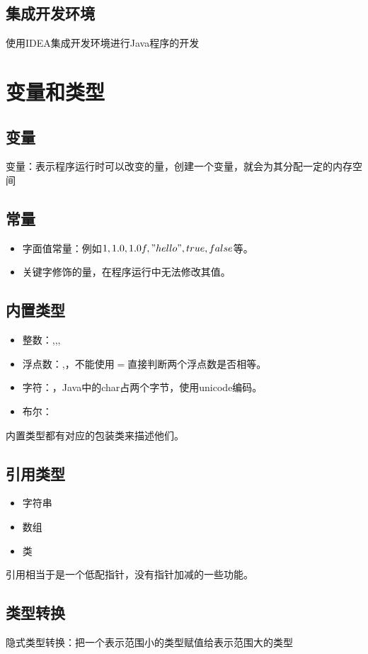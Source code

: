 \documentclass[a4paper]{report}
\begin{document}
\subsection{集成开发环境}
使用IDEA集成开发环境进行Java程序的开发

\section{变量和类型}
\subsection{变量}
变量：表示程序运行时可以改变的量，创建一个变量，就会为其分配一定的内存空间
\subsection{常量}
\begin{itemize}
\itemsep=0pt \parskip =0pt
  \item 字面值常量：例如$1,1.0,1.0f,"hello",true,false$等。
  \item {}关键字修饰的量，在程序运行中无法修改其值。
\end{itemize}
\subsection{内置类型}
\begin{itemize}
\itemsep=0pt \parskip =0pt
  \item 整数：,,,
  \item 浮点数：,，不能使用$=$直接判断两个浮点数是否相等。
  \item 字符：，Java中的char占两个字节，使用unicode编码。
  \item 布尔：
\end{itemize}
内置类型都有对应的包装类来描述他们。
\subsection{引用类型}
\begin{itemize}
\itemsep=0pt \parskip =0pt
  \item 字符串
  \item 数组
  \item 类
\end{itemize}

引用相当于是一个低配指针，没有指针加减的一些功能。

\subsection{类型转换}
隐式类型转换：把一个表示范围小的类型赋值给表示范围大的类型
\end{document}
